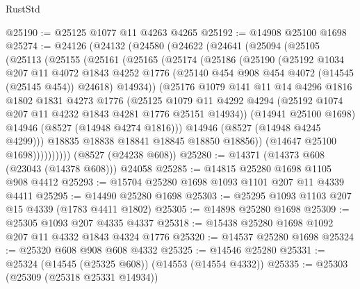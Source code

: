 \begin{lexlean}{RustStd}
\begin{coremodule}
@25190 := @25125 @1077 @11 @4263 @4265
@25192 := @14908 @25100 @1698
@25274 := @24126
    (@24132
      (@24580
        (@24622
          (@24641
            (@25094
              (@25105
                (@25113
                  (@25155
                    (@25161
                      (@25165
                        (@25174
                          (@25186
                            (@25190
                              (@25192
                                @1034
                                @207
                                @11
                                @4072
                                @1843
                                @4252
                                @1776
                                (@25140 @454 @908 @454 @4072 (@14545 (@25145 @454)) @24618)
                                @14934))
                            (@25176
                              @1079
                              @141
                              @11
                              @14
                              @4296
                              @1816
                              @1802
                              @1831
                              @4273
                              @1776
                              (@25125
                                @1079
                                @11
                                @4292
                                @4294
                                (@25192 @1074 @207 @11 @4232 @1843 @4281 @1776 @25151 @14934))
                              (@14941 @25100 @1698)
                              @14946
                              (@8527 (@14948 @4274 @1816)))
                            @14946
                            (@8527 (@14948 @4245 @4299)))
                          @18835
                          @18838
                          @18841
                          @18845
                          @18850
                          @18856))
                      (@14647 @25100 @1698))))))))))
    (@8527 (@24238 @608))
@25280 := @14371 (@14373 @608 (@23043 (@14378 @608))) @24058
@25285 := @14815 @25280 @1698 @1105 @908 @4412
@25293 := @15704 @25280 @1698 @1093 @1101 @207 @11 @4339 @4411
@25295 := @14490 @25280 @1698
@25303 := @25295 @1093 @1103 @207 @15 @4339 (@1783 @4411 @1802)
@25305 := @14898 @25280 @1698
@25309 := @25305 @1093 @207 @4335 @4337
@25318 := @15438 @25280 @1698 @1092 @207 @11 @4332 @1843 @4324 @1776
@25320 := @14537 @25280 @1698
@25324 := @25320 @608 @908 @608 @4332
@25325 := @14546 @25280
@25331 := @25324 (@14545 (@25325 @608)) (@14553 (@14554 @4332))
@25335 := @25303 (@25309 (@25318 @25331 @14934))

\end{coremodule}
\end{lexlean}
